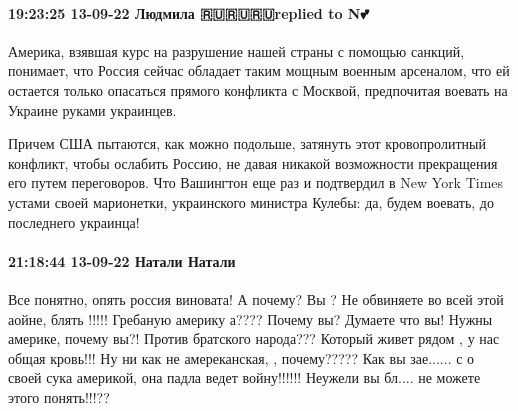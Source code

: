 \paragraph{19:23:25 13-09-22 Людмила 🇷🇺🇷🇺🇷🇺replied to N💕🌹}

Америка, взявшая курс на разрушение нашей страны с помощью санкций, понимает,
что Россия сейчас обладает таким мощным военным арсеналом, что ей остается
только опасаться прямого конфликта с Москвой, предпочитая воевать на Украине
руками украинцев.

Причем США пытаются, как можно подольше, затянуть этот кровопролитный конфликт,
чтобы ослабить Россию, не давая никакой возможности прекращения его путем
переговоров. Что Вашингтон еще раз и подтвердил в New York Times устами своей
марионетки, украинского министра Кулебы: да, будем воевать, до последнего
украинца!

\paragraph{21:18:44 13-09-22 Натали Натали}

Все понятно, опять россия виновата! А почему? Вы ? Не обвиняете во всей этой
аойне, блять !!!!! Гребаную америку а???? Почему вы? Думаете что вы! Нужны
америке, почему вы?! Против братского народа??? Который живет рядом , у нас
общая кровь!!! Ну ни как не амереканская, , почему????? Как вы зае...... с о
своей сука америкой, она падла ведет войну!!!!!! Неужели вы бл.... не можете
этого понять!!!??
